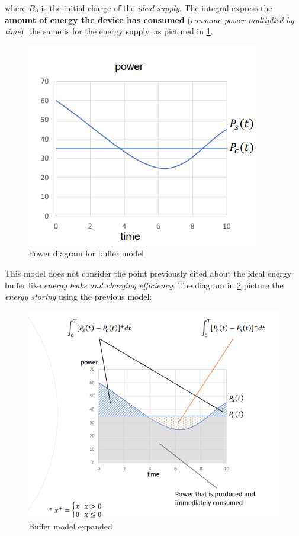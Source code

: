 \documentclass[10pt,a4paper]{report}
\theoremstyle{definition}
\begin{document}
where $B_{0}$ is the initial charge of the \textit{ideal supply}.
The integral express the \textbf{amount of energy the device has consumed} (\textit{consume power multiplied by time}), the same is for the energy supply, as pictured in \ref{buffer-energy-diagram}.
\begin{figure}
	\centering\includegraphics[scale=0.50]{images/Pasted image 20230424164214.png}
	\caption{Power diagram for buffer model}
\label{buffer-energy-diagram}
\end{figure}

This model does not consider the point previously cited about the ideal energy buffer like \textit{energy leaks and charging efficiency}.
The diagram in \ref{buffer-energy-diagram-explained} picture the \textit{energy storing} using the previous model:
\begin{figure}[h]
	\centering\includegraphics[scale=0.60]{images/Pasted image 20230421171802.png}
	\caption{Buffer model expanded}
\label{buffer-energy-diagram-explained}
\end{figure}
\end{document}
